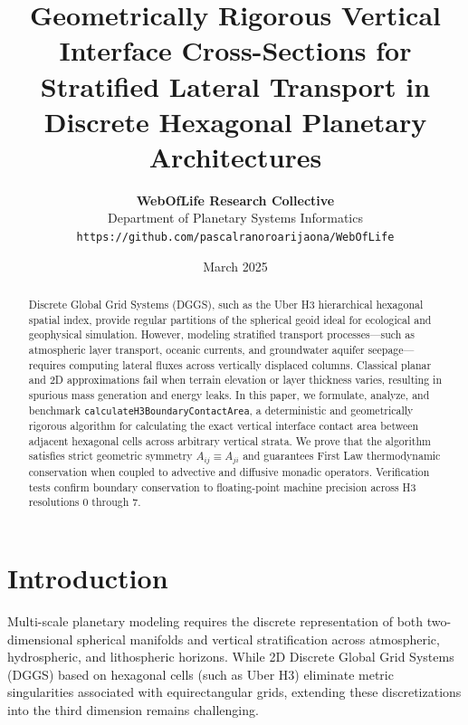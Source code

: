 \documentclass[11pt,a4paper]{article}
\title{\textbf{Geometrically Rigorous Vertical Interface Cross-Sections for Stratified Lateral Transport in Discrete Hexagonal Planetary Architectures}}
\author{
  \textbf{WebOfLife Research Collective} \\
  Department of Planetary Systems Informatics \\
  \texttt{https://github.com/pascalranoroarijaona/WebOfLife}
}
\date{March 2025}
\theoremstyle{definition}
\begin{document}
\maketitle

\begin{abstract}
Discrete Global Grid Systems (DGGS), such as the Uber H3 hierarchical hexagonal spatial index, provide regular partitions of the spherical geoid ideal for ecological and geophysical simulation. However, modeling stratified transport processes---such as atmospheric layer transport, oceanic currents, and groundwater aquifer seepage---requires computing lateral fluxes across vertically displaced columns. Classical planar and 2D approximations fail when terrain elevation or layer thickness varies, resulting in spurious mass generation and energy leaks. In this paper, we formulate, analyze, and benchmark \texttt{calculateH3BoundaryContactArea}, a deterministic and geometrically rigorous algorithm for calculating the exact vertical interface contact area between adjacent hexagonal cells across arbitrary vertical strata. We prove that the algorithm satisfies strict geometric symmetry $A_{ij} \equiv A_{ji}$ and guarantees First Law thermodynamic conservation when coupled to advective and diffusive monadic operators. Verification tests confirm boundary conservation to floating-point machine precision across H3 resolutions 0 through 7.
\end{abstract}

\section{Introduction}

Multi-scale planetary modeling requires the discrete representation of both two-dimensional spherical manifolds and vertical stratification across atmospheric, hydrospheric, and lithospheric horizons. While 2D Discrete Global Grid Systems (DGGS) based on hexagonal cells (such as Uber H3) eliminate metric singularities associated with equirectangular grids, extending these discretizations into the third dimension remains challenging.
\end{document}
